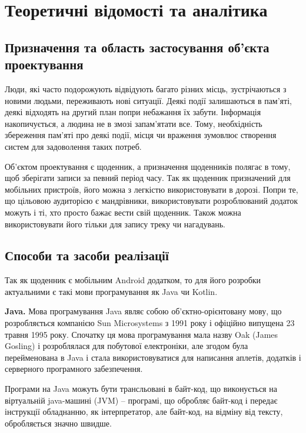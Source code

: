 \documentclass[../main.tex]{subfiles}
\begin{document}
\chapter{Теоретичні відомості та аналітика}

\section{Призначення та область застосування об'єкта проектування}

Люди, які часто подорожують відвідують багато різних місць, зустрічаються з новими людьми, переживають нові ситуації. Деякі події залишаються в пам'яті, деякі відходять на другий план попри небажання їх забути. Інформація накопичується, а людина не в змозі запам'ятати все. Тому, необхідність збереження пам'яті про деякі події, місця чи враження зумовлює створення систем для задоволення таких потреб.

Об'єктом проектування є щоденник, а призначення щоденників полягає в тому, щоб зберігати записи за певний період часу. Так як щоденник призначений для мобільних пристроїв, його можна з легкістю використовувати в дорозі. Попри те, що цільовою аудиторією є мандрівники, використовувати розроблюваний додаток можуть і ті, хто просто бажає вести свій щоденник. Також можна використовувати його тільки для запису треку чи нагадувань.

\section{Способи та засоби реалізації}

Так як щоденник є мобільним Android додатком, то для його розробки актуальними є такі мови програмування як Java чи Kotlin. 

{\bfseries{Java.}}
Мова програмування Java являє собою об'єктно-орієнтовану мову, що розробляється компанією Sun Microsystems з 1991 року і офіційно випущена 23 травня 1995 року. Спочатку ця мова програмування  мала назву Oak (James Gosling) і розроблялася для побутової електроніки, але згодом була перейменована в Java і стала використовуватися для написання аплетів, додатків і серверного програмного забезпечення.

Програми на Java можуть бути трансльовані в байт-код, що виконується на віртуальній java-машині (JVM) -- програмі, що обробляє байт-код і передає інструкції обладнанню, як інтерпретатор, але байт-код, на відміну від тексту, обробляється значно швидше.
\end{document}
